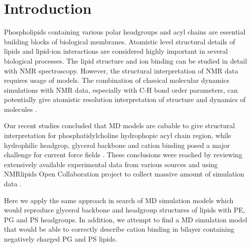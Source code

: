 \documentclass[aps,prl,superscriptaddress,twocolumn]{revtex4}
\begin{document}
\section{Introduction}
Phospholipids containing various polar headgroups and acyl
chains are essential building blocks of biological membranes.
Atomistic level structural details of lipids and lipid-ion 
interactions are considered highly important in several
biological processes. The lipid structure and ion binding
can be studied in detail with NMR spectroscopy. However,
the structural interpretation of NMR data requires usage
of models. The combination of classical molecular dynamics
simulations with NMR data, especially with C-H bond
order parameters, can potentially give atomistic resolution
interpretation of structure and dynamics of molecules \cite{botan15,ollila16,ferreira16}. 

Our recent studies concluded that MD models are cabable to
give structural interpretation for phosphatidylcholine 
hydrophopic acyl chain region, while hydrophilic headgrop, glycerol 
backbone and cation binding posed a major challenge for current
force fields \cite{botan15,ollila16,catte16,ferreira16}. 
These conclusions were reached by reviewing extensively 
available experimental data from various sources and using
NMRlipids Open Collaboration project to collect massive 
amount of simulation data \cite{botan15,catte16}.

Here we apply the same approach in search of MD simulation
models which would reproduce glycerol backbone and 
headgroup structures of lipids with PE, PG and PS headgroups.  
In addition, we attempt to find a MD simulation model
that would be able to correctly describe cation binding in
bilayer containing negatively charged PG and PS lipids.



\end{document}
